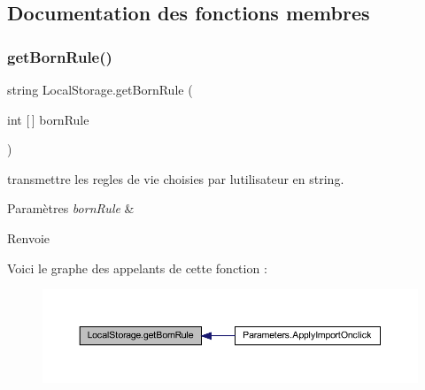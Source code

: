 \subsection{Documentation des fonctions membres}
\mbox{\label{class_local_storage_a64ead0288876a2aa3fbb7d86d3d68cc5}} 
\subsubsection{\texorpdfstring{get\+Born\+Rule()}{getBornRule()}}
{\footnotesize\ttfamily string Local\+Storage.\+get\+Born\+Rule (\begin{DoxyParamCaption}\item[{int \mbox{[}$\,$\mbox{]}}]{born\+Rule }\end{DoxyParamCaption})\hspace{0.3cm}{\ttfamily [inline]}}



transmettre les regles de vie choisies par l\textquotesingle{}utilisateur en string. 


\begin{DoxyParams}{Paramètres}
{\em born\+Rule} & \\
\hline
\end{DoxyParams}
\begin{DoxyReturn}{Renvoie}

\end{DoxyReturn}
Voici le graphe des appelants de cette fonction \+:
\nopagebreak
\begin{figure}[H]
\begin{center}
\leavevmode
\includegraphics[width=350pt]{class_local_storage_a64ead0288876a2aa3fbb7d86d3d68cc5_icgraph}
\end{center}
\end{figure}
\mbox{\label{class_local_storage_ab5a516f6f13a01e683b6b1c56b373937}} 
